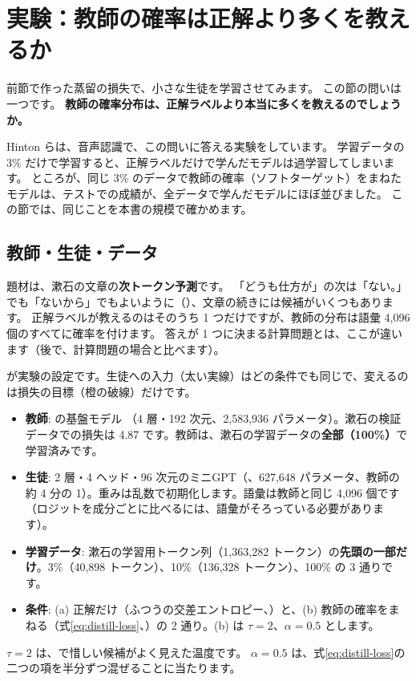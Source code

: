 \section{実験：教師の確率は正解より多くを教えるか}\label{sec:distill-exp}

前節で作った蒸留の損失で、小さな生徒を学習させてみます。
この節の問いは一つです。
\textbf{教師の確率分布は、正解ラベルより本当に多くを教えるのでしょうか。}

Hinton らは、音声認識で、この問いに答える実験をしています\cite{hinton2015distilling}。
学習データの 3\% だけで学習すると、正解ラベルだけで学んだモデルは過学習してしまいます。
ところが、同じ 3\% のデータで教師の確率（ソフトターゲット）をまねたモデルは、テストでの成績が、全データで学んだモデルにほぼ並びました。
この節では、同じことを本書の規模で確かめます。

\subsection{教師・生徒・データ}\label{sec:distill-exp-setup}

題材は、漱石の文章の\textbf{次トークン予測}です。
「どうも仕方が」の次は「ない。」でも「ないから」でもよいように（）、文章の続きには候補がいくつもあります。
正解ラベルが教えるのはそのうち 1 つだけですが、教師の分布は語彙 4,096 個のすべてに確率を付けます。
答えが 1 つに決まる計算問題とは、ここが違います（後で、計算問題の場合と比べます）。

が実験の設定です。生徒への入力（太い実線）はどの条件でも同じで、変えるのは損失の目標（橙の破線）だけです。
\begin{itemize}
\item \textbf{教師}: の基盤モデル （4 層・192 次元、2,583,936 パラメータ）。漱石の検証データでの損失は 4.87 です。教師は、漱石の学習データの\textbf{全部（100\%）}で学習済みです。
\item \textbf{生徒}: 2 層・4 ヘッド・96 次元のミニGPT（、627,648 パラメータ、教師の約 4 分の 1）。重みは乱数で初期化します。語彙は教師と同じ 4,096 個です（ロジットを成分ごとに比べるには、語彙がそろっている必要があります）。
\item \textbf{学習データ}: 漱石の学習用トークン列（1,363,282 トークン）の\textbf{先頭の一部だけ}。3\%（40,898 トークン）、10\%（136,328 トークン）、100\% の 3 通りです。
\item \textbf{条件}: (a) 正解だけ（ふつうの交差エントロピー、）と、(b) 教師の確率をまねる（式\eqref{eq:distill-loss}、）の 2 通り。(b) は $\tau=2$、$\alpha=0.5$ とします。
\end{itemize}
$\tau=2$ は、で惜しい候補がよく見えた温度です。
$\alpha=0.5$ は、式\eqref{eq:distill-loss}の二つの項を半分ずつ混ぜることに当たります。

